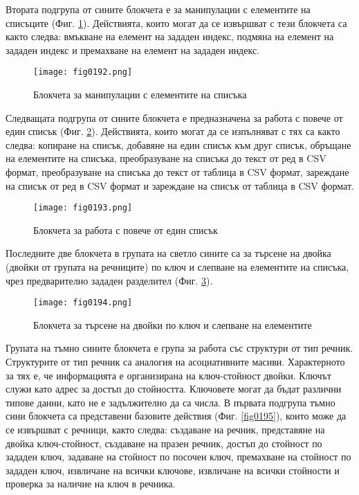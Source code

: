 Втората подгрупа от сините блокчета е за манипулации с елементите на списъците (Фиг. \ref{fig0192}). Действията, които могат да се извършват с тези блокчета са както следва: вмъкване на елемент на зададен индекс, подмяна на елемент на зададен индекс и премахване на елемент на зададен индекс.

\begin{figure}[H]
  \centering
  \texttt{[image: fig0192.png]}
  \caption{Блокчета за манипулации с елементите на списъка}
\label{fig0192}
\end{figure}

Следващата подгрупа от сините блокчета е предназначена за работа с повече от един списък (Фиг. \ref{fig0193}). Действията, които могат да се изпълняват с тях са както следва: копиране на списък, добавяне на един списък към друг списък, обръщане на елементите на списъка, преобразуване на списъка до текст от ред в CSV формат, преобразуване на списъка до текст от таблица в CSV формат, зареждане на списък от ред в CSV формат и зареждане на списък от таблица в CSV формат.

\begin{figure}[H]
  \centering
  \texttt{[image: fig0193.png]}
  \caption{Блокчета за работа с повече от един списък}
\label{fig0193}
\end{figure}

Последните две блокчета в групата на светло сините са за търсене на двойка (двойки от групата на речниците) по ключ и слепване на елементите на списъка, чрез предварително зададен разделител (Фиг. \ref{fig0194}).

\begin{figure}[H]
  \centering
  \texttt{[image: fig0194.png]}
  \caption{Блокчета за търсене на двойки по ключ и слепване на елементите}
\label{fig0194}
\end{figure}

Групата на тъмно сините блокчета е група за работа със структури от тип речник. Структурите от тип речник са аналогия на асоциативните масиви. Характерното за тях е, че информацията е организирана на ключ-стойност двойки. Ключът служи като адрес за достъп до стойността. Ключовете могат да бъдат различни типове данни, като не е задължително да са числа. В първата подгрупа тъмно сини блокчета са представени базовите действия (Фиг. \ref{fig0195}), които може да се извършват с речници, както следва: създаване на речник, представяне на двойка ключ-стойност, създаване на празен речник, достъп до стойност по зададен ключ, задаване на стойност по посочен ключ, премахване на стойност по зададен ключ, извличане на всички ключове, извличане на всички стойности и проверка за наличие на ключ в речника.

